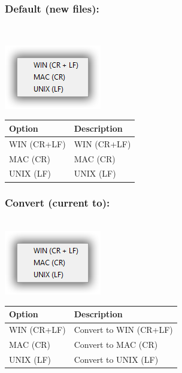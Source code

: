 \newpage
\hypertarget{menu_format_eol_default}{}
\subsubsection{Default (new files):}\\

\includegraphics[scale=0.8]{./res/eol.png}\\

\begin{scriptsize}
  \begin{tabularx}{\textwidth}{>{\hsize=0.3\hsize}X>{\hsize=0.7\hsize}X}\\
    \hline
    \textbf{Option} & \textbf{Description} \\
    \hline
    WIN (CR+LF) & WIN (CR+LF) \\
    MAC (CR) & MAC (CR) \\
    UNIX (LF) & UNIX (LF) \\
    \hline
  \end{tabularx}
\end{scriptsize}


\hypertarget{menu_format_eol_convert}{}
\subsubsection{Convert (current to):}\\

\includegraphics[scale=0.8]{./res/eol.png}\\

\begin{scriptsize}
  \begin{tabularx}{\textwidth}{>{\hsize=0.3\hsize}X>{\hsize=0.7\hsize}X}\\
    \hline
    \textbf{Option} & \textbf{Description} \\
    \hline
    WIN (CR+LF) & Convert to WIN (CR+LF) \\
    MAC (CR) & Convert to MAC (CR) \\
    UNIX (LF) & Convert to UNIX (LF) \\
    \hline
  \end{tabularx}
\end{scriptsize}


